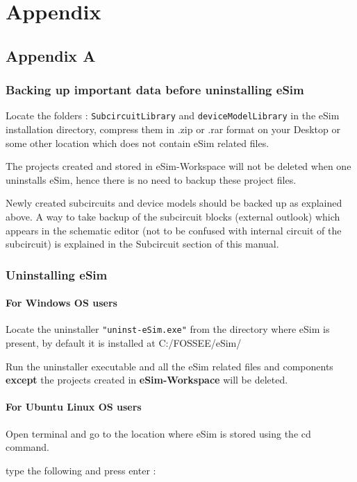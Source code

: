\chapter{Appendix}
\section{Appendix A}
\subsection{Backing up important data before uninstalling eSim}
\item Locate the folders : {\tt SubcircuitLibrary} and {\tt deviceModelLibrary} in the eSim installation directory, compress them in .zip or .rar format on your Desktop or some other location which does not contain eSim related files.
\item The projects created and stored in eSim-Workspace will not be deleted when one uninstalls eSim, hence there is no need to backup these project files. 
\item Newly created subcircuits and device models should be backed up as explained above. A way to take backup of the subcircuit blocks (external outlook) which appears in the schematic editor (not to be confused with internal circuit of the subcircuit) is explained in the Subcircuit section of this manual.

\subsection{Uninstalling eSim}

\subsubsection{For Windows OS users}
\item Locate the uninstaller {\tt "uninst-eSim.exe"} from the directory where eSim is present, by default it is installed at C:/FOSSEE/eSim/ 
\item Run the uninstaller executable and all the eSim related files and components \textbf{except} the projects created in \textbf{eSim-Workspace} will be deleted.

\subsubsection{For Ubuntu Linux OS users}
\item Open terminal and go to the location where eSim is stored using the cd command.
\item type the following and press enter : \\
